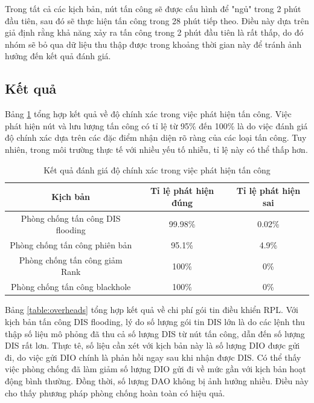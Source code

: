 Trong tất cả các kịch bản, nút tấn công sẽ được cấu hình để "ngủ" trong 2 phút đầu tiên, sau đó sẽ thực hiện tấn công trong 28 phút tiếp theo. Điều này dựa trên giả định rằng khả năng xảy ra tấn công trong 2 phút đầu tiên là rất thấp, do đó nhóm sẽ bỏ qua dữ liệu thu thập được trong khoảng thời gian này để tránh ảnh hưởng đến kết quả đánh giá.

\subsection{Kết quả}
Bảng \ref{table:accuracy} tổng hợp kết quả về độ chính xác trong việc phát hiện tấn công. Việc phát hiện nút và lưu lượng tấn công có tỉ lệ từ 95\% đến 100\% là do việc đánh giá độ chính xác dựa trên các đặc điểm nhận diện rõ ràng của các loại tấn công. Tuy nhiên, trong môi trường thực tế với nhiều yếu tố nhiễu, tỉ lệ này có thể thấp hơn.

\begin{table}[h]
    \centering
    \begin{tabular}{|c|c|c|}
        \hline
        \textbf{Kịch bản} & \textbf{Tỉ lệ phát hiện đúng} & \textbf{Tỉ lệ phát hiện sai} \\
        \hline
        Phòng chống tấn công DIS flooding & 99.98\% & 0.02\% \\
        \hline
        Phòng chống tấn công phiên bản & 95.1\% & 4.9\% \\
        \hline
        Phòng chống tấn công giảm Rank & 100\% & 0\% \\
        \hline
        Phòng chống tấn công blackhole & 100\% & 0\% \\
        \hline
    \end{tabular}
    \caption{Kết quả đánh giá độ chính xác trong việc phát hiện tấn công}
    \label{table:accuracy}
\end{table}

Bảng \ref{table:overheads} tổng hợp kết quả về chi phí gói tin điều khiển RPL. Với kịch bản tấn công DIS flooding, lý do số lượng gói tin DIS lớn là do các lệnh thu thập số liệu mô phỏng đã thu cả số lượng DIS từ nút tấn công, dẫn đến số lượng DIS rất lơn. Thực tê, số liệu cần xét với kịch bản này là số lượng DIO được gửi đi, do việc gửi DIO chính là phản hồi ngay sau khi nhận được DIS. Có thể thấy việc phòng chống đã làm giảm số lượng DIO gửi đi về mức gần với kịch bản hoạt động bình thường. Đồng thời, số lượng DAO không bị ảnh hưởng nhiều. Điều này cho thấy phương pháp phòng chống hoàn toàn có hiệu quả.

